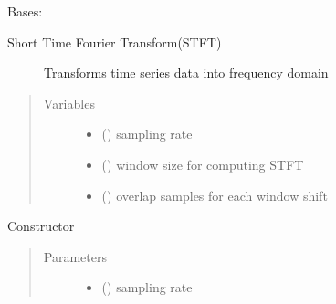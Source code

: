 \documentclass[letterpaper,10pt,english,openany,oneside]{sphinxmanual}
\begin{document}
\begin{fulllineitems}
\label{\detokenize{docs/source/preprocess:preprocess.preprocess_tools.STFT}}
Bases: 
\begin{description}
\item[{Short Time Fourier Transform(STFT)}] \leavevmode
Transforms time series data into frequency domain

\end{description}
\begin{quote}\begin{description}
\item[{Variables}] \leavevmode\begin{itemize}
\item {} 
 () \textendash{} sampling rate

\item {} 
 () \textendash{} window size for computing STFT

\item {} 
 () \textendash{} overlap samples for each window shift

\end{itemize}

\end{description}\end{quote}

\begin{fulllineitems}
\label{\detokenize{docs/source/preprocess:preprocess.preprocess_tools.STFT.__init__}}
Constructor
\begin{quote}\begin{description}
\item[{Parameters}] \leavevmode\begin{itemize}
\item {} 
 () \textendash{} sampling rate


\end{itemize}
\end{description}
\end{quote}
\end{fulllineitems}
\end{fulllineitems}
\end{document}
